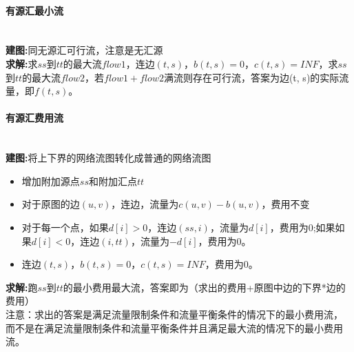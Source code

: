 \paragraph{有源汇最小流}~{}
\\
\textbf{建图:}同无源汇可行流，注意是无汇源\\
\textbf{求解:}求$ss$到$tt$的最大流$flow1$，连边$(t, s)$，$b(t, s)=0$，$c(t, s)=INF$，求$ss$到$tt$的最大流$flow2$，若$flow1+flow2$满流则存在可行流，答案为边(t, s)的实际流量，即$f(t, s)$。\\

\paragraph{有源汇费用流}~{}
\\
\textbf{建图:}将上下界的网络流图转化成普通的网络流图\\
\begin{itemize}
\item 增加附加源点$ss$和附加汇点$tt$
\item 对于原图的边$(u, v)$，连边，流量为$c(u, v)-b(u, v)$，费用不变
\item 对于每一个点，如果$d[i]>0$，连边$(ss, i)$，流量为$d[i]$，费用为$0$;如果如果$d[i]<0$，连边$(i, tt)$，流量为$-d[i]$，费用为$0$。\\
\item 连边$(t, s)$，$b(t, s)=0$，$c(t, s)=INF$，费用为$0$。\\
\end{itemize}
\textbf{求解:}跑$ss$到$tt$的最小费用最大流，答案即为（求出的费用+原图中边的下界*边的费用）\\
注意：求出的答案是满足流量限制条件和流量平衡条件的情况下的最小费用流，
而不是在满足流量限制条件和流量平衡条件并且满足最大流的情况下的最小费用流。\\